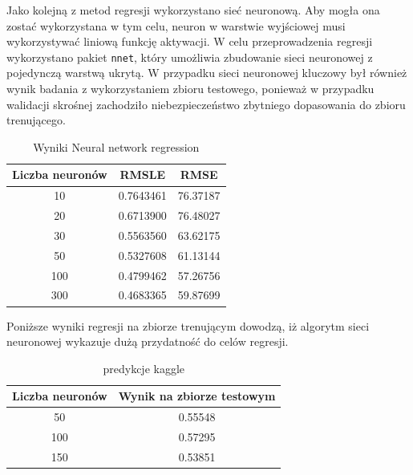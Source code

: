 \documentclass[a4paper,12pt]{article}
\begin{document}
    Jako kolejną z metod regresji wykorzystano sieć neuronową. Aby mogła ona zostać wykorzystana w tym celu, neuron w warstwie wyjściowej musi wykorzystywać
    liniową funkcję aktywacji. W celu przeprowadzenia regresji wykorzystano pakiet \texttt{nnet}, który umożliwia zbudowanie sieci neuronowej z pojedynczą
    warstwą ukrytą. W przypadku sieci neuronowej kluczowy był również wynik badania z wykorzystaniem zbioru testowego, ponieważ w przypadku walidacji
    skrośnej zachodziło niebezpieczeństwo zbytniego dopasowania do zbioru trenującego.
        \begin{table}
        	\centering
            \begin{tabular}{|c|c|c|}
            \hline 
            Liczba neuronów & RMSLE & RMSE \\ 
            \hline 
            10 & 0.7643461 & 76.37187 \\ 
            \hline 
            20 & 0.6713900 & 76.48027 \\ 
            \hline 
            30 & 0.5563560 & 63.62175 \\ 
            \hline 
            50 & 0.5327608 & 61.13144 \\ 
            \hline 
            100 & 0.4799462 & 57.26756 \\ 
            \hline 
            300 & 0.4683365 & 59.87699 \\ 
            \hline 
            \end{tabular} 
            \caption{Wyniki Neural network regression}
        \end{table}
        
        Poniższe wyniki regresji na zbiorze trenującym dowodzą, iż algorytm sieci neuronowej wykazuje dużą przydatność do celów regresji.
        
        \begin{table}
        	\centering
            \begin{tabular}{|c|c|}
            \hline 
            Liczba neuronów & Wynik na zbiorze testowym \\ 
            \hline 
            50 & 0.55548 \\ 
            \hline 
            100 & 0.57295 \\ 
            \hline 
            150 & 0.53851 \\ 
            \hline 
            \end{tabular} 
            \caption{predykcje kaggle}
        \end{table}    
    
\end{document}
